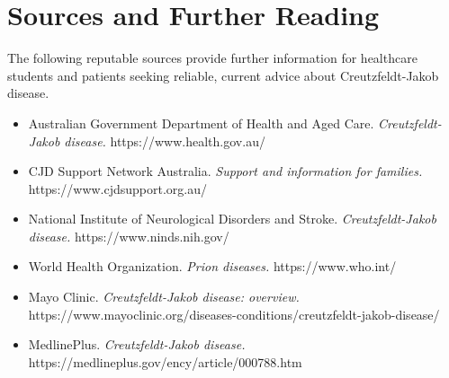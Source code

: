 \section*{Sources and Further Reading}
The following reputable sources provide further information for healthcare students and patients seeking reliable, current advice about Creutzfeldt-Jakob disease.

\begin{itemize}
    \item Australian Government Department of Health and Aged Care. \textit{Creutzfeldt-Jakob disease.} https://www.health.gov.au/
    \item CJD Support Network Australia. \textit{Support and information for families.} https://www.cjdsupport.org.au/
    \item National Institute of Neurological Disorders and Stroke. \textit{Creutzfeldt-Jakob disease.} https://www.ninds.nih.gov/
    \item World Health Organization. \textit{Prion diseases.} https://www.who.int/
    \item Mayo Clinic. \textit{Creutzfeldt-Jakob disease: overview.} https://www.mayoclinic.org/diseases-conditions/creutzfeldt-jakob-disease/
    \item MedlinePlus. \textit{Creutzfeldt-Jakob disease.} https://medlineplus.gov/ency/article/000788.htm
\end{itemize}
